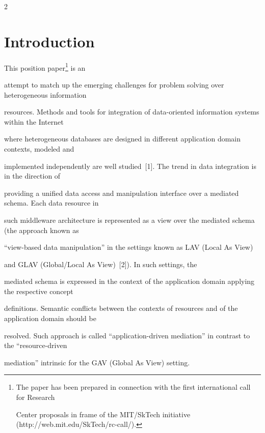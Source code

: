       \begin{multicols}{2}





            \label{st\stat}





\section{Introduction}





\noindent


This position paper\footnote[4]{The paper has been prepared in connection with the first international call for Research 


Center proposals in frame of the MIT/SkTech initiative ({\sf http://web.mit.edu/SkTech/rc-call/}).} is an 


attempt to match up the emerging challenges for problem solving over heterogeneous information 


resources. Methods and tools for integration of data-oriented information systems within the Internet 


where heterogeneous databases are designed in different application domain contexts, modeled and 


implemented independently are well studied~[1]. The trend in data integration is in the direction of 


providing a unified data access and manipulation interface over a mediated schema. Each data resource in 


such middleware architecture is represented as a view over the mediated schema (the approach known as 


``view-based data manipulation'' in the settings known as LAV (Local As View)


and GLAV (Global/Local As View)~[2]). In such settings, the 


mediated schema is expressed in the context of the application domain applying the respective concept 


definitions. Semantic conflicts between the contexts of resources and of the application domain should be 


resolved. Such approach is called ``application-driven mediation'' in contrast to the ``resource-driven 


mediation'' intrinsic for the GAV (Global As View) setting.






\end{multicols}
